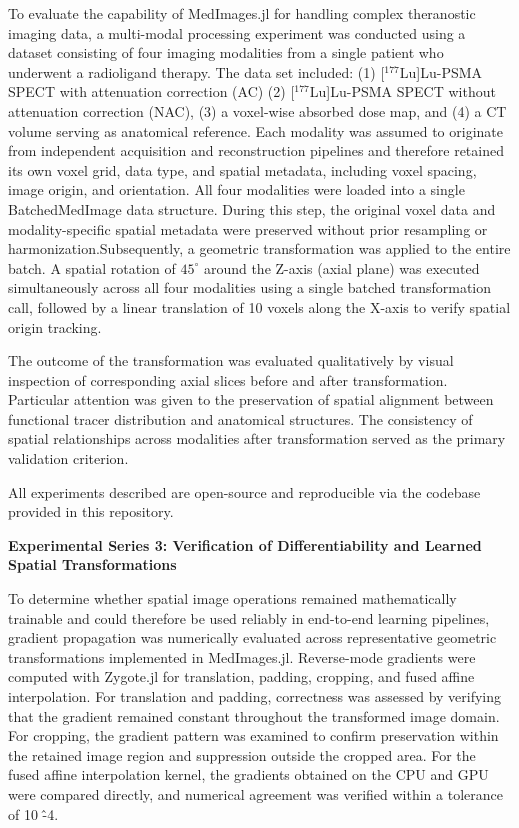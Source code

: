 \documentclass[a4paper,10pt]{elsarticle}
\begin{document}
To evaluate the capability of MedImages.jl for handling complex theranostic imaging data, a multi-modal processing experiment was conducted using a dataset consisting of four imaging modalities from a single patient who underwent a radioligand therapy. The data set included: (1) [$^{177}$Lu]Lu-PSMA SPECT with attenuation correction (AC) (2) [$^{177}$Lu]Lu-PSMA SPECT without attenuation correction (NAC), (3) a voxel-wise absorbed dose map, and (4) a CT volume serving as anatomical reference. Each modality was assumed to originate from independent acquisition and reconstruction pipelines and therefore retained its own voxel grid, data type, and spatial metadata, including voxel spacing, image origin, and orientation.
All four modalities were loaded into a single BatchedMedImage data structure. During this step, the original voxel data and modality-specific spatial metadata were preserved without prior resampling or harmonization.Subsequently, a geometric transformation was applied to the entire batch. A spatial rotation of $45^{\circ}$ around the Z-axis (axial plane) was executed simultaneously across all four modalities using a single batched transformation call, followed by a linear translation of 10 voxels along the X-axis to verify spatial origin tracking.

The outcome of the transformation was evaluated qualitatively by visual inspection of corresponding axial slices before and after transformation. Particular attention was given to the preservation of spatial alignment between functional tracer distribution and anatomical structures. The consistency of spatial relationships across modalities after transformation served as the primary validation criterion. 

 All experiments described are open-source and reproducible via the codebase provided in this repository.

\textbf{Experimental Series 3: Verification of Differentiability and Learned Spatial Transformations}

To determine whether spatial image operations remained mathematically trainable and could therefore be used reliably in end-to-end learning pipelines, gradient propagation was numerically evaluated across representative geometric transformations implemented in MedImages.jl. Reverse-mode gradients were computed with Zygote.jl for translation, padding, cropping, and fused affine interpolation. For translation and padding, correctness was assessed by verifying that the gradient remained constant throughout the transformed image domain. For cropping, the gradient pattern was examined to confirm preservation within the retained image region and suppression outside the cropped area. For the fused affine interpolation kernel, the gradients obtained on the CPU and GPU were compared directly, and numerical agreement was verified within a tolerance of 10 \^ -4. 
\end{document}
